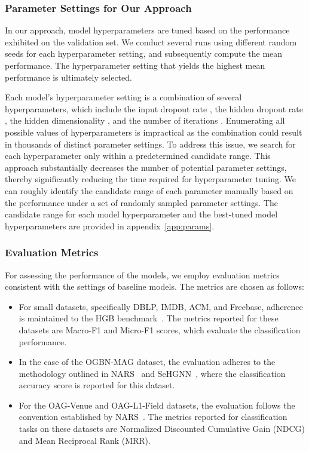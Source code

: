 \documentclass[lettersize,journal]{IEEEtran}
\begin{document}
\subsubsection{Parameter Settings for Our Approach}

In our approach, model hyperparameters are tuned based on the performance exhibited on the validation set. 
We conduct several runs using different random seeds for each hyperparameter setting, and subsequently compute the mean performance. 
The hyperparameter setting that yields the highest mean performance is ultimately selected.


Each model's hyperparameter setting is a combination of several hyperparameters, which include the input dropout rate , the hidden dropout rate , the hidden dimensionality , and the number of iterations .
Enumerating all possible values of hyperparameters is impractical as the combination could result in thousands of distinct parameter settings.
To address this issue, we search for each hyperparameter only within a predetermined candidate range. 
This approach substantially decreases the number of potential parameter settings, thereby significantly reducing the time required for hyperparameter tuning.
We can roughly identify the candidate range of each parameter manually based on the performance under a set of randomly sampled parameter settings.
The candidate range for each model hyperparameter and the best-tuned model hyperparameters are provided in appendix~\ref{app:params}. 









\subsubsection{Evaluation Metrics}

For assessing the performance of the models, we employ evaluation metrics consistent with the settings of baseline models. 
The metrics are chosen as follows:
\begin{itemize}
\item For small datasets, specifically DBLP, IMDB, ACM, and Freebase, adherence is maintained to the HGB benchmark~\cite{DBLP:conf/kdd/LvDLCFHZJDT21}. 
The metrics reported for these datasets are Macro-F1 and Micro-F1 scores, which evaluate the classification performance.
\item In the case of the OGBN-MAG dataset, the evaluation adheres to the methodology outlined in NARS~\cite{yu2020scalable} and SeHGNN~\cite{yang2022simple}, where the classification accuracy score is reported for this dataset.
\item For the OAG-Venue and OAG-L1-Field datasets, the evaluation follows the convention established by NARS~\cite{yu2020scalable}. 
The metrics reported for classification tasks on these datasets are Normalized Discounted Cumulative Gain (NDCG) and Mean Reciprocal Rank (MRR).
\end{itemize}
\end{document}
